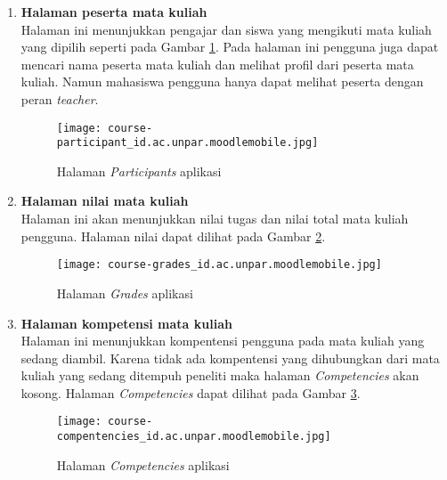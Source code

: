 \begin{enumerate}
\item \textbf{Halaman peserta mata kuliah} \\
Halaman ini menunjukkan pengajar dan siswa yang mengikuti mata kuliah yang dipilih seperti pada Gambar \ref{app:participants}. Pada halaman ini pengguna juga dapat mencari nama peserta mata kuliah dan melihat profil dari peserta mata kuliah. Namun mahasiswa pengguna hanya dapat melihat peserta dengan peran \textit{teacher}. 

\begin{figure}[H] 
	\centering  
	\texttt{[image: course-participant\_id.ac.unpar.moodlemobile.jpg]}  
	\caption[Halaman \textit{Participants} aplikasi] {Halaman \textit{Participants} aplikasi} 
	\label{app:participants} 
\end{figure}  

\item \textbf{Halaman nilai mata kuliah} \\
Halaman ini akan menunjukkan nilai tugas dan nilai total mata kuliah pengguna. Halaman nilai dapat dilihat pada Gambar \ref{app:grades}.

\begin{figure}[H] 
	\centering  
	\texttt{[image: course-grades\_id.ac.unpar.moodlemobile.jpg]}  
	\caption[Halaman \textit{Grades} aplikasi] {Halaman \textit{Grades} aplikasi} 
	\label{app:grades} 
\end{figure}  


\item \textbf{Halaman kompetensi mata kuliah} \\
Halaman ini menunjukkan kompentensi pengguna pada mata kuliah yang sedang diambil. Karena tidak ada kompentensi yang dihubungkan dari mata kuliah yang sedang ditempuh peneliti maka halaman \textit{Competencies} akan kosong. Halaman \textit{Competencies} dapat dilihat pada Gambar \ref{app:competencies}.

\begin{figure}[H] 
	\centering  
	\texttt{[image: course-compentencies\_id.ac.unpar.moodlemobile.jpg]}  
	\caption[Halaman \textit{Competencies} aplikasi] {Halaman \textit{Competencies} aplikasi} 
	\label{app:competencies} 
\end{figure}  

\end{enumerate}

